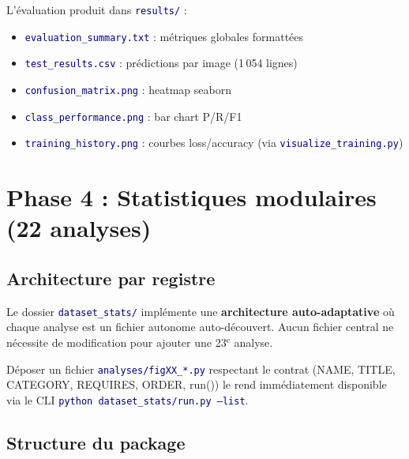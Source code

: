 \documentclass[11pt,a4paper,oneside]{report}
\newcommand{\code}[1]{\texttt{\textcolor{navy}{#1}}}
\begin{document}
L'évaluation produit dans \code{results/} :
\begin{itemize}
\item \code{evaluation\_summary.txt} : métriques globales formattées
\item \code{test\_results.csv} : prédictions par image (1\,054 lignes)
\item \code{confusion\_matrix.png} : heatmap seaborn
\item \code{class\_performance.png} : bar chart P/R/F1
\item \code{training\_history.png} : courbes loss/accuracy (via \code{visualize\_training.py})
\end{itemize}

\chapter{Phase 4 : Statistiques modulaires (22 analyses)}

\section{Architecture par registre}

Le dossier \code{dataset\_stats/} implémente une \textbf{architecture auto-adaptative} où chaque analyse est un fichier autonome auto-découvert. Aucun fichier central ne nécessite de modification pour ajouter une 23$^{\text{e}}$ analyse.

\begin{infobox}[Principe : 1 fichier = 1 analyse]
Déposer un fichier \code{analyses/figXX\_*.py} respectant le contrat (NAME, TITLE, CATEGORY, REQUIRES, ORDER, run()) le rend immédiatement disponible via le CLI \code{python dataset\_stats/run.py --list}.
\end{infobox}

\section{Structure du package}
\end{document}
